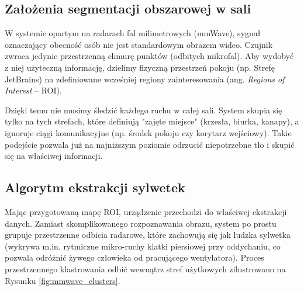 \documentclass[14pt,a4paper]{extarticle}
\begin{document}
\subsection{Założenia segmentacji obszarowej w sali}
W systemie opartym na radarach fal milimetrowych (mmWave), sygnał oznaczający obecność osób nie jest standardowym obrazem wideo. Czujnik zwraca jedynie przestrzenną chmurę punktów (odbitych mikrofal). Aby wydobyć z niej użyteczną informację, dzielimy fizyczną przestrzeń pokoju (np. Strefę JetBrains) na zdefiniowane wcześniej regiony zainteresowania (ang. \textit{Regions of Interest} – ROI).

Dzięki temu nie musimy śledzić każdego ruchu w całej sali. System skupia się tylko na tych strefach, które definiują "zajęte miejsce" (krzesła, biurka, kanapy), a ignoruje ciągi komunikacyjne (np. środek pokoju czy korytarz wejściowy). Takie podejście pozwala już na najniższym poziomie odrzucić niepotrzebne tło i skupić się na właściwej informacji.

\subsection{Algorytm ekstrakcji sylwetek}
Mając przygotowaną mapę ROI, urządzenie przechodzi do właściwej ekstrakcji danych. Zamiast skomplikowanego rozpoznawania obrazu, system po prostu grupuje przestrzenne odbicia radarowe, które zachowują się jak ludzka sylwetka (wykrywa m.in. rytmiczne mikro-ruchy klatki piersiowej przy oddychaniu, co pozwala odróżnić żywego człowieka od pracującego wentylatora). Proces przestrzennego klastrowania odbić wewnątrz stref użytkowych zilustrowano na Rysunku \ref{fig:mmwave_clusters}.
\end{document}
